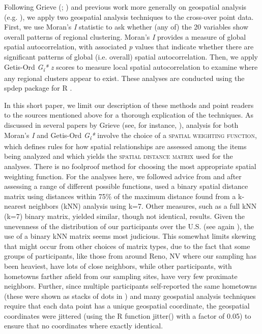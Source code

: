 \documentclass[output=paper]{LSP/langsci}
\begin{document}
Following Grieve (\citealt{grieve_corpus-based_2009}; \citealt{grieve_statistical_2011,grieve_multivariate_2013}) and previous work more generally on geospatial analysis (e.g. \citealt{moran_notes_1950,ord_local_1995}), we apply two geospatial analysis techniques to the cross-over point data. First, we use Moran’s \textit{I} statistic to ask whether (any of) the 20 variables show overall patterns of regional clustering. Moran’s \textit{I }provides a measure of global spatial autocorrelation, with associated \textit{p} values that indicate whether there are significant patterns of global (i.e. overall) spatial autocorrelation. Then, we apply Getis-Ord \textit{G}\textit{\textsubscript{i}}\textit{*} \textit{z }scores to measure local spatial autocorrelation to examine where any regional clusters appear to exist. These analyses are conducted using the spdep package for R \citep{bivand_spdep._2014}.

In this short paper, we limit our description of these methods and point readers to the sources mentioned above for a thorough explication of the techniques. As discussed in several papers by Grieve (see, for instance, \citealt{grieve_comparison_2014}), analysis for both Moran’s \textit{I} and Getis-Ord \textit{G}\textit{\textsubscript{i}}\textit{*} involve the choice of a \textsc{spatial weighting function}, which defines rules for how spatial relationships are assessed among the items being analyzed and which yields the \textsc{spatial distance matrix} used for the analyses. There is no foolproof method for choosing the most appropriate spatial weighting function. For the analyses here, we followed advice from \citet{bivand_creating_2014} and after assessing a range of different possible functions, used a binary spatial distance matrix using distances within 75\% of the maximum distance found from a k-nearest neighbors (kNN) analysis using k=7. Other measures, such as a full kNN (k=7) binary matrix, yielded similar, though not identical, results. Given the unevenness of the distribution of our participants over the U.S. (see again ), the use of a binary kNN matrix seems most judicious. This somewhat limits skewing that might occur from other choices of matrix types, due to the fact that some groups of participants, like those from around Reno, NV where our sampling has been heaviest, have lots of close neighbors, while other participants, with hometowns farther afield from our sampling sites, have very few proximate neighbors. Further, since multiple participants self-reported the same hometowns (these were shown as stacks of dots in ) and many geospatial analysis techniques require that each data point has a unique geospatial coordinate, the geospatial coordinates were jittered (using the R function jitter() with a factor of 0.05) to ensure that no coordinates where exactly identical.
\end{document}
